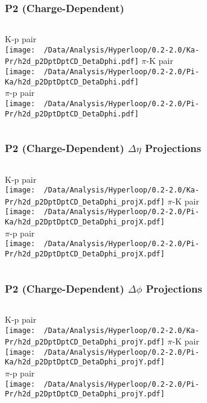 \documentclass{beamer}
\begin{document}
\begin{frame}
	\frametitle{P2 (Charge-Dependent)}
	\begin{columns}
		\centering
		K-p pair\\
		\texttt{[image: ~/Data/Analysis/Hyperloop/0.2-2.0/Ka-Pr/h2d\_p2DptDptCD\_DetaDphi.pdf]}
		\centering
		$\pi$-K pair\\
		\texttt{[image: ~/Data/Analysis/Hyperloop/0.2-2.0/Pi-Ka/h2d\_p2DptDptCD\_DetaDphi.pdf]}\\$\pi$-p pair\\
		\texttt{[image: ~/Data/Analysis/Hyperloop/0.2-2.0/Pi-Pr/h2d\_p2DptDptCD\_DetaDphi.pdf]}
	\end{columns}
\end{frame}
\begin{frame}
	\frametitle{P2 (Charge-Dependent) $\Delta\eta$ Projections}
	\begin{columns}
		\column{0.5\textwidth}
		\centering
		K-p pair\\
		\texttt{[image: ~/Data/Analysis/Hyperloop/0.2-2.0/Ka-Pr/h2d\_p2DptDptCD\_DetaDphi\_projX.pdf]}
		\column{0.5\textwidth}
		\centering
		$\pi$-K pair\\
		\texttt{[image: ~/Data/Analysis/Hyperloop/0.2-2.0/Pi-Ka/h2d\_p2DptDptCD\_DetaDphi\_projX.pdf]}\\$\pi$-p pair\\
		\texttt{[image: ~/Data/Analysis/Hyperloop/0.2-2.0/Pi-Pr/h2d\_p2DptDptCD\_DetaDphi\_projX.pdf]}
	\end{columns}
\end{frame}
\begin{frame}
	\frametitle{P2 (Charge-Dependent) $\Delta\phi$ Projections}
	\begin{columns}
		\centering
		K-p pair\\
		\texttt{[image: ~/Data/Analysis/Hyperloop/0.2-2.0/Ka-Pr/h2d\_p2DptDptCD\_DetaDphi\_projY.pdf]}
		\centering
		$\pi$-K pair\\
		\texttt{[image: ~/Data/Analysis/Hyperloop/0.2-2.0/Pi-Ka/h2d\_p2DptDptCD\_DetaDphi\_projY.pdf]}\\$\pi$-p pair\\
		\texttt{[image: ~/Data/Analysis/Hyperloop/0.2-2.0/Pi-Pr/h2d\_p2DptDptCD\_DetaDphi\_projY.pdf]}
	\end{columns}
\end{frame}
\end{document}
